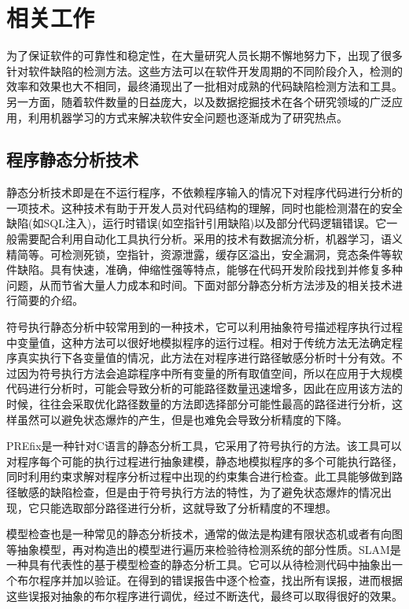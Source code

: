 \chapter{相关工作}
\label{chap:intro}

为了保证软件的可靠性和稳定性，在大量研究人员长期不懈地努力下，出现了很多针对软件缺陷的检测方法。这些方法可以在软件开发周期的不同阶段介入，检测的效率和效果也大不相同，最终涌现出了一批相对成熟的代码缺陷检测方法和工具。另一方面，随着软件数量的日益庞大，以及数据挖掘技术在各个研究领域的广泛应用，利用机器学习的方式来解决软件安全问题也逐渐成为了研究热点。

\section{程序静态分析技术}

静态分析技术即是在不运行程序，不依赖程序输入的情况下对程序代码进行分析的一项技术。这种技术有助于开发人员对代码结构的理解，同时也能检测潜在的安全缺陷(如SQL注入)，运行时错误(如空指针引用缺陷)以及部分代码逻辑错误。它一般需要配合利用自动化工具执行分析。采用的技术有数据流分析，机器学习，语义精简等。可检测死锁，空指针，资源泄露，缓存区溢出，安全漏洞，竞态条件等软件缺陷。具有快速，准确，伸缩性强等特点，能够在代码开发阶段找到并修复多种问题，从而节省大量人力成本和时间。下面对部分静态分析方法涉及的相关技术进行简要的介绍。

符号执行静态分析中较常用到的一种技术，它可以利用抽象符号描述程序执行过程中变量值，这种方法可以很好地模拟程序的运行过程。相对于传统方法无法确定程序真实执行下各变量值的情况，此方法在对程序进行路径敏感分析时十分有效。不过因为符号执行方法会追踪程序中所有变量的所有取值空间，所以在应用于大规模代码进行分析时，可能会导致分析的可能路径数量迅速增多，因此在应用该方法的时候，往往会采取优化路径数量的方法即选择部分可能性最高的路径进行分析，这样虽然可以避免状态爆炸的产生，但是也难免会导致分析精度的下降。

PREfix是一种针对C语言的静态分析工具，它采用了符号执行的方法。该工具可以对程序每个可能的执行过程进行抽象建模，静态地模拟程序的多个可能执行路径，同时利用约束求解对程序分析过程中出现的约束集合进行检查。此工具能够做到路径敏感的缺陷检查，但是由于符号执行方法的特性，为了避免状态爆炸的情况出现，它只能选取部分路径进行分析，这就导致了分析精度的不理想。

模型检查也是一种常见的静态分析技术，通常的做法是构建有限状态机或者有向图等抽象模型，再对构造出的模型进行遍历来检验待检测系统的部分性质。SLAM是一种具有代表性的基于模型检查的静态分析工具。它可以从待检测代码中抽象出一个布尔程序并加以验证。在得到的错误报告中逐个检查，找出所有误报，进而根据这些误报对抽象的布尔程序进行调优，经过不断迭代，最终可以取得很好的效果。

